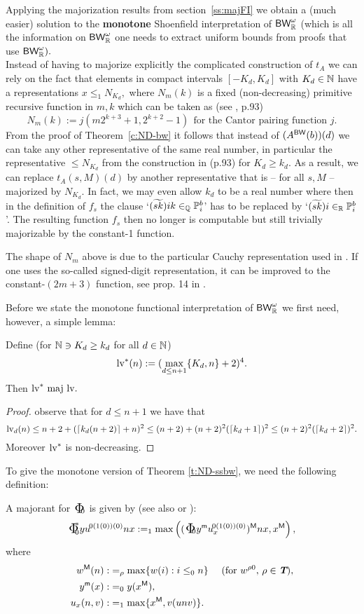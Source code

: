 Applying the majorization results from section~\ref{ss:majFI} we obtain a 
(much easier) solution to the {\bf monotone} Shoenfield interpretation 
of $\textsf{\upshape BW}^\omega_{\mathbb{R}}$ (which is all the information on $\textsf{\upshape BW}^\omega_{\mathbb{R}}$ 
one needs to extract uniform bounds from proofs that use $\textsf{\upshape BW}^\omega_{\mathbb{R}}).$ 
\\ Instead of having to majorize explicitly the complicated construction of 
$t_A$ we can rely on the fact that elements in 
compact intervals $[-K_d,K_d]$ with 
$K_d\in\mathbb{N}$ have a representations $x\le_1 N_{K_d},$ where $N_m(k)$ is a 
fixed (non-decreasing) primitive recursive function in 
$m,k$ which can be taken as 
(see \cite{Kohlenbach08}, p.93) 
\[ N_m(k):=j(m2^{k+3}+1,2^{k+2}-1) \ \ \mbox{for the Cantor 
pairing function $j.$} \] 
From the proof of Theorem~\ref{c:ND-bw} it follows that instead of 
$(A^{\textsf{\upshape BW}}(b))(d)$ we can take any other representative of the same 
real number, in particular the representative $\le N_{K_d}$ from 
the construction in \cite{Kohlenbach08}(p.93) for $K_d \ge k_d.$ As a 
result, we can replace $t_A(s,M)(d)$ by another representative 
that is -- for all $s,M$ --  
majorized by $N_{K_d}.$ In fact, we may even allow $k_d$ to be a real number 
where then in the definition of $f_s$ the clause `$(\widetilde{sk})ik
\in_{\mathbb{Q}} \mathbb{P}^b_i$' has to be replaced by `$(\widetilde{sk})i
\in_{\mathbb{R}} \mathbb{P}^b_i$'. The resulting function $f_s$ then no longer is computable 
but still trivially majorizable by the constant-1 function. \\ 
\begin{remark} The shape of $N_m$ above is due to the particular Cauchy representation 
used in \cite{Kohlenbach08}. If one uses the so-called signed-digit representation, it 
can be improved to the constant-$(2m+3)$ function, see prop. 14 in \cite{Engracia}.
\end{remark}
Before we state the monotone functional interpretation of $\textsf{\upshape BW}^\omega_{\mathbb{R}}$ 
we first need, however, a simple lemma: 
\begin{lemma} Define (for $\mathbb{N}\ni K_d\ge k_d$ for all $d\in\mathbb{N}$)
\[ \mathrm {lv}^*(n):=(\max\limits_{d\leq n+1} \{ K_d,n\}+2)^4. \]
Then $\mathrm {lv}^*\,\operatorname{maj}\, \mathrm {lv}.$
\end{lemma}
\begin{proof}
observe that for $d\leq n+1$ we have that
 \[\mathrm {lv}_d(n)\leq n+2+(\lceil k_d (n+2)\rceil+n)^2
 \leq (n+2)+(n+2)^2(\lceil k_d + 1\rceil)^2
 \leq (n+2)^2(\lceil k_d + 2\rceil)^2.\] Moreover $\mathrm {lv}^*$ is non-decreasing.
\end{proof}
To give the monotone version of Theorem \ref{t:ND-ssbw}, we need the 
following definition:
\begin{dfn} A majorant for $\bPhi_0$ is given by (see also 
\cite{Kohlenbach08} or \cite{Bezem85}):
\[\bPhi^*_0{y}u^{\!0(1(0))(0)}nx:=_1\max\left( 
(\bPhi_0{y^{\mon}}u_{x}^{\!0(1(0))(0)}){^\Mon} nx,x{^\Mon}\right),\]
where 
\begin{align*}
w{^{\textsf{\upshape M}}}(n):&=_\rho\max\{w(i):i\leq_0 n\}\quad \text{ 
(for $w^{\rho0}$, $\rho\in\emph{\protect\textbf{T}}$)}, \\
y{^{\textsf{\upshape m}}}(x):&=_0y(x{^{\textsf{\upshape M}}}), \\
u_x(n,v):&=_1\max\{x{^{\textsf{\upshape M}}},v(unv)\}.
\end{align*}
\end{dfn}

